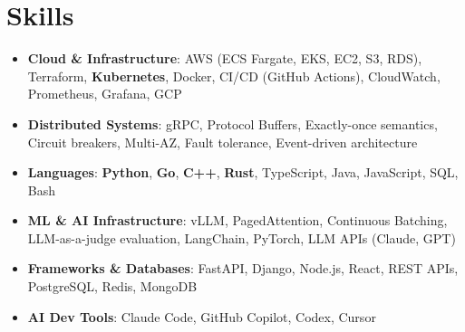 \documentclass[letterpaper,11pt]{article}
\newcommand{\resumeSubHeadingListStart}{\begin{itemize}[leftmargin=0.15in, label={}]}
\newcommand{\resumeSubHeadingListEnd}{\end{itemize}}
\newcommand{\resumeSkillHeading}[2]{%
  \item\small{\textbf{#1}: #2 \vspace{-9pt}}%
}
\begin{document}
\section{Skills}
  \resumeSubHeadingListStart
    \resumeSkillHeading{Cloud \& Infrastructure}{AWS (ECS Fargate, EKS, EC2, S3, RDS), Terraform, \textbf{Kubernetes}, Docker, CI/CD (GitHub Actions), CloudWatch, Prometheus, Grafana, GCP}
    \resumeSkillHeading{Distributed Systems}{gRPC, Protocol Buffers, Exactly-once semantics, Circuit breakers, Multi-AZ, Fault tolerance, Event-driven architecture}
    \resumeSkillHeading{Languages}{\textbf{Python}, \textbf{Go}, \textbf{C++}, \textbf{Rust}, TypeScript, Java, JavaScript, SQL, Bash}
    \resumeSkillHeading{ML \& AI Infrastructure}{vLLM, PagedAttention, Continuous Batching, LLM-as-a-judge evaluation, LangChain, PyTorch, LLM APIs (Claude, GPT)}
    \resumeSkillHeading{Frameworks \& Databases}{FastAPI, Django, Node.js, React, REST APIs, PostgreSQL, Redis, MongoDB}
    \resumeSkillHeading{AI Dev Tools}{Claude Code, GitHub Copilot, Codex, Cursor}
  \resumeSubHeadingListEnd
\end{document}
